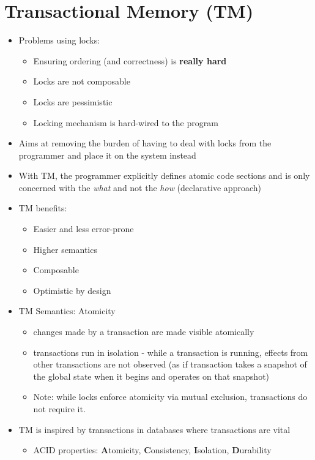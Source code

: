 \documentclass[a4paper]{article}
\begin{document}
\section{Transactional Memory (TM)}
\begin{itemize}
\item Problems using locks:
\begin{itemize}
\item Ensuring ordering (and correctness) is \textbf{really hard}
\item Locks are not composable
\item Locks are pessimistic
\item Locking mechanism is hard-wired to the program
\end{itemize}

\item Aims at removing the burden of having to deal with locks from the programmer and place it on the system instead
\item With TM, the programmer explicitly defines atomic code sections and is only concerned with the \textsl{what} and not the \textsl{how} (declarative approach)
\item TM benefits: 
\begin{itemize}
\item Easier and less error-prone
\item Higher semantics
\item Composable
\item Optimistic by design
\end{itemize}
\item TM Semantics: Atomicity
\begin{itemize}
\item changes made by a transaction are made visible atomically
\item  transactions run in isolation - while a transaction is running, effects from other transactions are not observed (as if transaction takes a snapshot of the global state when it begins and operates on that snapshot)
\item Note: while locks enforce atomicity via mutual exclusion, transactions do not require it.
\end{itemize}
\item TM is inspired by transactions in databases where transactions are vital 
\begin{itemize}
\item ACID properties: \textbf{A}tomicity, \textbf{C}onsistency, \textbf{I}solation, \textbf{D}urability
\end{itemize}




\end{itemize}
\end{document}
